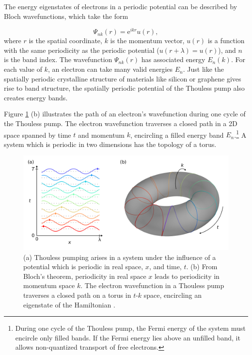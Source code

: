\documentclass{beavtex_dub_edit}
\begin{document}
The energy eigenstates of electrons in a periodic potential can be described by Bloch wavefunctions, which take the form

\begin{equation}
    \Psi_{nk}(r) = \mathrm{e}^{ikr}u(r), \label{Bloch's theorem}
\end{equation}
where $r$ is the spatial coordinate, $k$ is the momentum vector, $u(r)$ is a function with the same periodicity as the periodic potential ($u(r+ \lambda) = u(r)$), and $n$ is the band index. The wavefunction $\Psi_{nk}(r)$ has associated energy $E_n(k)$. For each value of $k$, an electron can take many valid energies $E_n$. Just like the spatially periodic crystalline structure of materials like silicon or graphene gives rise to band structure, the spatially periodic potential of the Thouless pump also creates energy bands.

Figure \ref{thouless pump torus} (b) illustrates the path of an electron's wavefunction during one cycle of the Thouless pump. The electron wavefunction traverses a closed path in a 2D space spanned by time $t$ and momentum $k$, encircling a filled energy band $E_n$.\footnote{During one cycle of the Thouless pump, the Fermi energy of the system must encircle only filled bands. If the Fermi energy lies above an unfilled band, it allows non-quantized transport of free electrons.} A system which is periodic in two dimensions has the topology of a torus.

\begin{figure}
    \includegraphics[width = 1\textwidth]{Thouless pump fig.png}
    \caption[(a) Thouless pumping arises in a system under the influence of a potential which is periodic in real space, $x$, and time, $t$. (b) From Bloch's theorem, periodicity in real space $x$ leads to periodicity in momentum space $k$.]{(a) Thouless pumping arises in a system under the influence of a potential which is periodic in real space, $x$, and time, $t$. (b) From Bloch's theorem, periodicity in real space $x$ leads to periodicity in momentum space $k$. The electron wavefunction in a Thouless pump traverses a closed path on a torus in $t\textrm{-}k$ space, encircling an eigenstate of the Hamiltonian \cite{thouless_quantization_1983}.}
    \label{thouless pump torus}
\end{figure}
\end{document}

